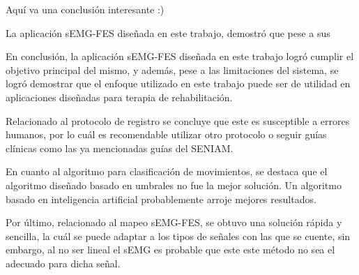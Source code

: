 Aquí va una conclusión interesante :)

La aplicación sEMG-FES diseñada en este trabajo, demostró que pese a sus 

En conclusión, la aplicación sEMG-FES diseñada en este trabajo logró cumplir el objetivo principal del mismo, y además, pese a las limitaciones del sistema, se logró demostrar que el enfoque utilizado en este trabajo puede ser de utilidad en aplicaciones diseñadas para terapia de rehabilitación.

Relacionado al protocolo de registro se concluye que este es susceptible a errores humanos, por lo cuál es recomendable utilizar otro protocolo o seguir guías clínicas como las ya mencionadas guías del SENIAM.

En cuanto al algoritmo para clasificación de movimientos, se destaca que el algoritmo diseñado basado en umbrales no fue la mejor solución. Un algoritmo basado en inteligencia artificial probablemente arroje mejores resultados.

Por último, relacionado al mapeo sEMG-FES, se obtuvo una solución rápida y sencilla, la cuál se puede adaptar a los tipos de señales con las que se cuente, sin embargo, al no ser lineal el sEMG es probable que este este método no sea el adecuado para dicha señal.
 